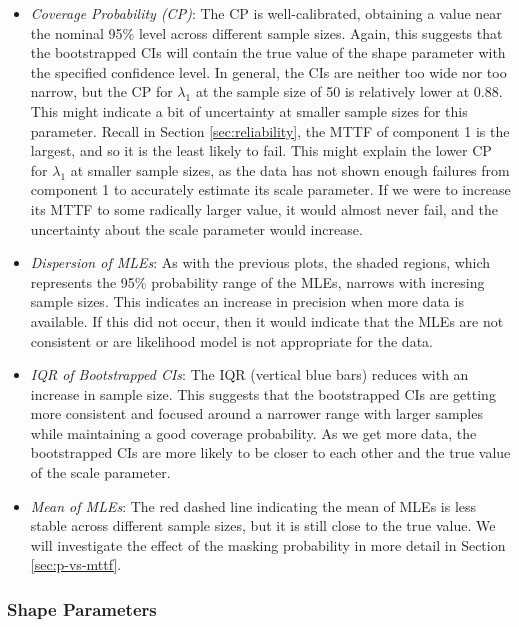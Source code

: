 \documentclass[
]{article}
\begin{document}
\begin{itemize}
\item
  \emph{Coverage Probability (CP)}: The CP is well-calibrated, obtaining
  a value near the nominal 95\% level across different sample sizes.
  Again, this suggests that the bootstrapped CIs will contain the true
  value of the shape parameter with the specified confidence level. In
  general, the CIs are neither too wide nor too narrow, but the CP for
  \(\lambda_1\) at the sample size of 50 is relatively lower at 0.88.
  This might indicate a bit of uncertainty at smaller sample sizes for
  this parameter. Recall in Section \ref{sec:reliability}, the MTTF of
  component 1 is the largest, and so it is the least likely to fail.
  This might explain the lower CP for \(\lambda_1\) at smaller sample
  sizes, as the data has not shown enough failures from component 1 to
  accurately estimate its scale parameter. If we were to increase its
  MTTF to some radically larger value, it would almost never fail, and
  the uncertainty about the scale parameter would increase.
\item
  \emph{Dispersion of MLEs}: As with the previous plots, the shaded
  regions, which represents the 95\% probability range of the MLEs,
  narrows with incresing sample sizes. This indicates an increase in
  precision when more data is available. If this did not occur, then it
  would indicate that the MLEs are not consistent or are likelihood
  model is not appropriate for the data.
\item
  \emph{IQR of Bootstrapped CIs}: The IQR (vertical blue bars) reduces
  with an increase in sample size. This suggests that the bootstrapped
  CIs are getting more consistent and focused around a narrower range
  with larger samples while maintaining a good coverage probability. As
  we get more data, the bootstrapped CIs are more likely to be closer to
  each other and the true value of the scale parameter.
\item
  \emph{Mean of MLEs}: The red dashed line indicating the mean of MLEs
  is less stable across different sample sizes, but it is still close to
  the true value. We will investigate the effect of the masking
  probability in more detail in Section \ref{sec:p-vs-mttf}.
\end{itemize}

\hypertarget{shape-parameters}{%
\subsubsection{Shape Parameters}\label{shape-parameters}}
\end{document}
